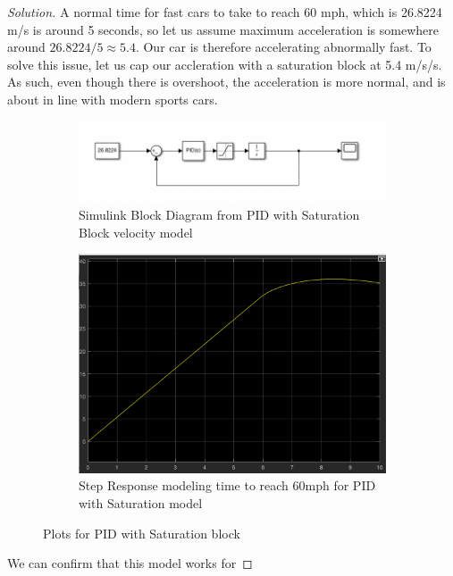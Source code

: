 \documentclass{article}
\begin{document}
\begin{proof}[Solution]
A normal time for fast cars to take to reach 60 mph, which is 26.8224 m/s is around 5 seconds, so let us assume maximum acceleration is somewhere around $26.8224/5 \approx 5.4$.
Our car is therefore accelerating abnormally fast. To solve this issue, let us cap our accleration with a saturation block at 5.4 m/s/s.
As such, even though there is overshoot, the acceleration is more normal, and is about in line with modern sports cars.

  \begin{figure}[h!]
    \centering
    \begin{subfigure}{0.4\linewidth}
      \includegraphics[width=\linewidth]{q3goodmodel.png}
      \caption{Simulink Block Diagram from PID with Saturation Block velocity model}
    \end{subfigure}
    \begin{subfigure}{0.4\linewidth}
      \includegraphics[width=\linewidth]{img13.png}
      \caption{Step Response modeling time to reach 60mph for PID with Saturation model}
    \end{subfigure}
    \caption{Plots for PID with Saturation block}
  \end{figure}

  We can confirm that this model works for 
\end{proof}
\end{document}
